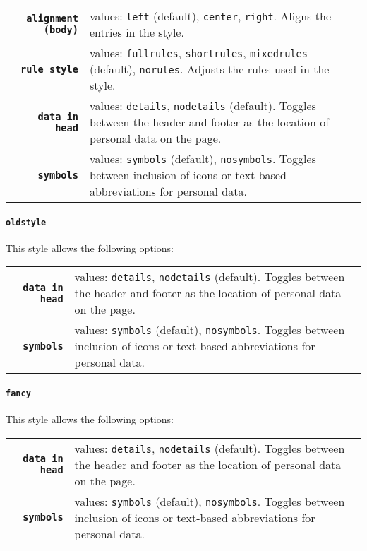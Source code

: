 \documentclass[a4paper, 11pt]{article}
\newcommand{\code}[1]{\lstinline!#1!}
\begin{document}
\begin{tabular}{r@{\hspace{2ex}}p{}}
  \textbf{\code{alignment (body)}} & values: \code{left} (default), \code{center}, \code{right}.
  Aligns the entries in the style. \\
  \textbf{\code{rule style}}       & values: \code{fullrules}, \code{shortrules}, \code{mixedrules} (default), \code{norules}.
  Adjusts the rules used in the style. \\
  \textbf{\code{data in head}}     & values: \code{details}, \code{nodetails} (default).
  Toggles between the header and footer as the location of personal data on the page. \\
  \textbf{\code{symbols}}          & values: \code{symbols} (default), \code{nosymbols}.
  Toggles between inclusion of icons or text-based abbreviations for personal data.
\end{tabular}

\paragraph{\code{oldstyle}}
This style allows the following options:

\begin{tabular}{r@{\hspace{2ex}}p{}}
  \textbf{\code{data in head}} & values: \code{details}, \code{nodetails} (default).
  Toggles between the header and footer as the location of personal data on the page. \\
  \textbf{\code{symbols}}      & values: \code{symbols} (default), \code{nosymbols}.
  Toggles between inclusion of icons or text-based abbreviations for personal data.
\end{tabular}

\paragraph{\code{fancy}}
This style allows the following options:

\begin{tabular}{r@{\hspace{2ex}}p{}}
  \textbf{\code{data in head}} & values: \code{details}, \code{nodetails} (default).
  Toggles between the header and footer as the location of personal data on the page. \\
  \textbf{\code{symbols}}      & values: \code{symbols} (default), \code{nosymbols}.
  Toggles between inclusion of icons or text-based abbreviations for personal data.
\end{tabular}
\end{document}
